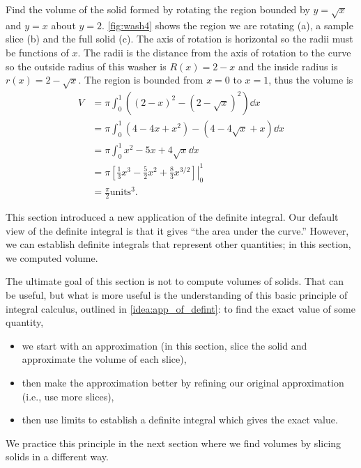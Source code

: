 \begin{example}\label{ex_wash_4}%
Find the volume of the solid formed by rotating the region bounded by $y=\sqrt x$ and $y=x$ about $y=2$.
\solution
\autoref{fig:wash4} shows the region we are rotating (a), a sample slice (b) and the full solid (c). The axis of rotation is horizontal so the radii must be functions of $x$. The radii is the distance from the axis of rotation to the curve so the outside radius of this washer is $R(x)=2-x$ and the inside radius is $r(x)=2-\sqrt x$. The region is bounded from  $x=0$ to $x=1$, thus the volume is
\begin{align*}
V&=\pi \int_0^1 \left( (2-x)^2-(2-\sqrt x)^2\right) \dd x\\
&=\pi \int_0^1 (4-4x+x^2)-(4-4\sqrt x+x)\dd x\\
&=\pi \int_0^1 x^2 -5x+4\sqrt x \dd x\\
&=\pi \left.\left[\frac13 x^3-\frac52 x^2+\frac83 x^{3/2}\right]\right|_0^1\\
&=\frac{\pi}{2} \text{units}^3.
\end{align*}
\end{example}

This section introduced a new application of the definite integral. Our default view of the definite integral is that it gives ``the area under the curve.'' However, we can establish definite integrals that represent other quantities; in this section, we computed volume.

The ultimate goal of this section is not to compute volumes of solids. That can be useful, but what is more useful is the understanding of this basic principle of integral calculus, outlined in \autoref{idea:app_of_defint}: to find the exact value of some quantity, 
\begin{itemize}
	\item we start with an approximation (in this section, slice the solid and approximate the volume of each slice), 
	\item then make the approximation better by refining our original approximation (i.e., use more slices), 
	\item	then use limits to establish a definite integral which gives the exact value.
\end{itemize}

We practice this principle in the next section where we find volumes by slicing solids in a different way.

